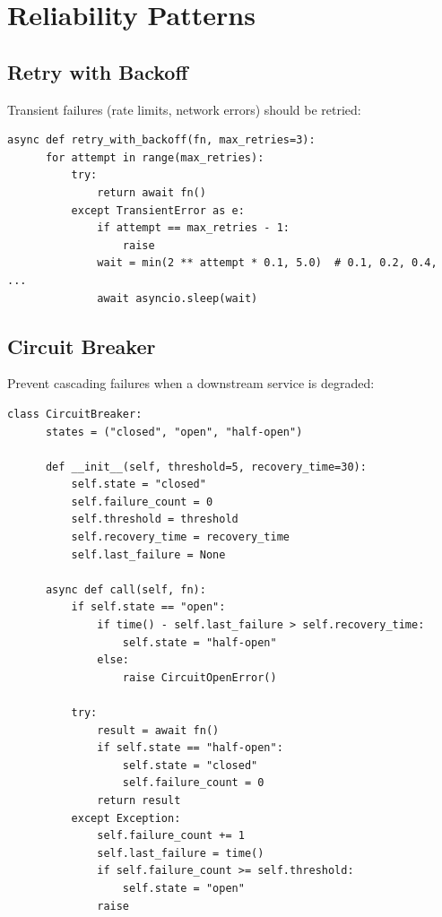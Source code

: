 \section{Reliability Patterns}

\subsection{Retry with Backoff}

Transient failures (rate limits, network errors) should be retried:

\begin{lstlisting}[caption=Exponential backoff for tool calls]
  async def retry_with_backoff(fn, max_retries=3):
      for attempt in range(max_retries):
          try:
              return await fn()
          except TransientError as e:
              if attempt == max_retries - 1:
                  raise
              wait = min(2 ** attempt * 0.1, 5.0)  # 0.1, 0.2, 0.4, ...
              await asyncio.sleep(wait)
\end{lstlisting}

\subsection{Circuit Breaker}

Prevent cascading failures when a downstream service is degraded:

\begin{lstlisting}[caption=Circuit breaker pattern]
  class CircuitBreaker:
      states = ("closed", "open", "half-open")

      def __init__(self, threshold=5, recovery_time=30):
          self.state = "closed"
          self.failure_count = 0
          self.threshold = threshold
          self.recovery_time = recovery_time
          self.last_failure = None

      async def call(self, fn):
          if self.state == "open":
              if time() - self.last_failure > self.recovery_time:
                  self.state = "half-open"
              else:
                  raise CircuitOpenError()

          try:
              result = await fn()
              if self.state == "half-open":
                  self.state = "closed"
                  self.failure_count = 0
              return result
          except Exception:
              self.failure_count += 1
              self.last_failure = time()
              if self.failure_count >= self.threshold:
                  self.state = "open"
              raise
\end{lstlisting}

